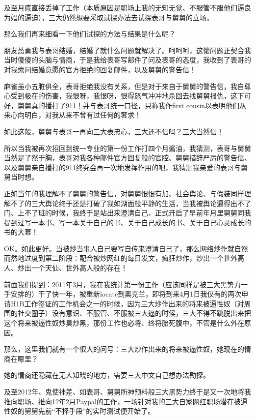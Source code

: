 \documentclass[9pt, b5paper]{article}
\begin{document}
及至月底直接丢掉了工作（本质原因是职场上我的无知无觉、不服管不服他们逼良为娼的逼迫），三大仍然想要采取试探办法去试探表哥与舅舅的立场。

那么我们再来细看一下他们试探的方法与结果是什么呢？

朋友怂勇我与表哥结婚，结婚了就什么问题就解决了。呵呵呵，这傻问题正契合我当时傻傻的头脑与情商，于是我给表哥写邮件了问及表哥的态度，我收到了表哥的对我索问结婚意愿的官方拒绝的回复邮件，以及舅舅的警告信！

麻雀虽小五脏俱全，表哥拒绝我没有关系，但是对于来自于舅舅的警告信，我自尊心受到极在的伤害，我恨呀，我恨呀，恨得怒气冲冲地杀回去找舅舅报仇，这下可好，舅舅真的播打了911！并与表哥统一口径，只称我作first cousin以表明他们从来心向明白，对我从来不曾有过任何的奢求！

如此这般，舅舅与表哥一再向三大表忠心，三大还不信吗？三大当然信！

所以当我被再次招回到统一专业的第一份工作打四个月酱油，我猜测，表哥与舅舅当然是了然于胸，表哥对我各种邮件官方回复般的官腔、舅舅措辞严厉的警告信、以及舅舅亲自播打的911终究会再一次地发挥作用的吧，我猜测我亲爱的表哥与舅舅当时想。 

正如当年的我理解不了舅舅的警告信，对舅舅恨恨有加、社会舆论、与假装同样理解不了的三大舆论终于还是打破了我如湖面般平静的生活，当我被舆论逼得出不了门、上不了班的时候，我终于是站出来澄清自己、正式开启了早前年月里舅舅同我提到过写一本书、写一本关于自己的书、关于自己成长的书、关于自己心灵成长的书的大幕！

OK。如此更好。当被炒当事人自己要写自传来澄清自己了，那么网络炒作就自然而然地过度到第二阶段：配合被炒网红的每日发文，疯狂炒作，炒出一个世外高人、炒出一个天仙、世外高人般的存在！


前面我们提到：2011年3月，我在我统计第一份工作（应该同样是被三大黑势力一手安排的）干了快一年，被重新locate到奥克兰，即将到来4月1日我仅有的两次申请H1B工作签证的工作机会之一的时候，因为三大炒作出来的将来被逼性奴（对周围的社交圈子）没有意识、不服管、不服被三大逼的时候，三大不得不跳脱出来把这个将来被逼性奴炒臭炒黑，那份工作也必将、终将胎死腹中，不管是什么外在原因。

那么，这里我们就有一个很大的问号：三大炒作出来的将来被逼性奴，她现在的情商在哪里？

她的情商还隐藏在无人知晓的地方，需要三大中文自己想办法勘探。

及至2012年、鬼使神差、如表哥、舅舅所神预料般三大黑势力终于是又一次地将我推向职场、推向12年2月Paypal的工作，一场针对我的三大自家网红职场潜在被逼性奴的舅舅先前“不择手段”的实时测试便开始了。
\end{document}
